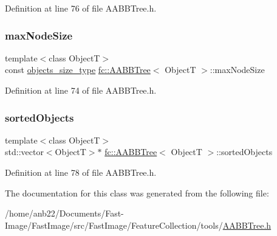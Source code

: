 Definition at line 76 of file A\+A\+B\+B\+Tree.\+h.

\mbox{\label{classfc_1_1AABBTree_a4116e801983d055e249fa6166fa47266}} 
\subsubsection{\texorpdfstring{max\+Node\+Size}{maxNodeSize}}
{\footnotesize\ttfamily template$<$class ObjectT$>$ \\
const \hyperlink{classfc_1_1AABBTree_a3333c421c1fa34841043bd8545de8ea8}{objects\+\_\+size\+\_\+type} \hyperlink{classfc_1_1AABBTree}{fc\+::\+A\+A\+B\+B\+Tree}$<$ ObjectT $>$\+::max\+Node\+Size\hspace{0.3cm}{\ttfamily [private]}}



Definition at line 74 of file A\+A\+B\+B\+Tree.\+h.

\mbox{\label{classfc_1_1AABBTree_ad28d9de49d42c0dffae1f6c47be5b523}} 
\subsubsection{\texorpdfstring{sorted\+Objects}{sortedObjects}}
{\footnotesize\ttfamily template$<$class ObjectT$>$ \\
std\+::vector$<$ObjectT$>$$\ast$ \hyperlink{classfc_1_1AABBTree}{fc\+::\+A\+A\+B\+B\+Tree}$<$ ObjectT $>$\+::sorted\+Objects\hspace{0.3cm}{\ttfamily [private]}}



Definition at line 78 of file A\+A\+B\+B\+Tree.\+h.



The documentation for this class was generated from the following file\+:\begin{DoxyCompactItemize}
\item 
/home/anb22/\+Documents/\+Fast-\/\+Image/\+Fast\+Image/src/\+Fast\+Image/\+Feature\+Collection/tools/\hyperlink{AABBTree_8h}{A\+A\+B\+B\+Tree.\+h}\end{DoxyCompactItemize}
